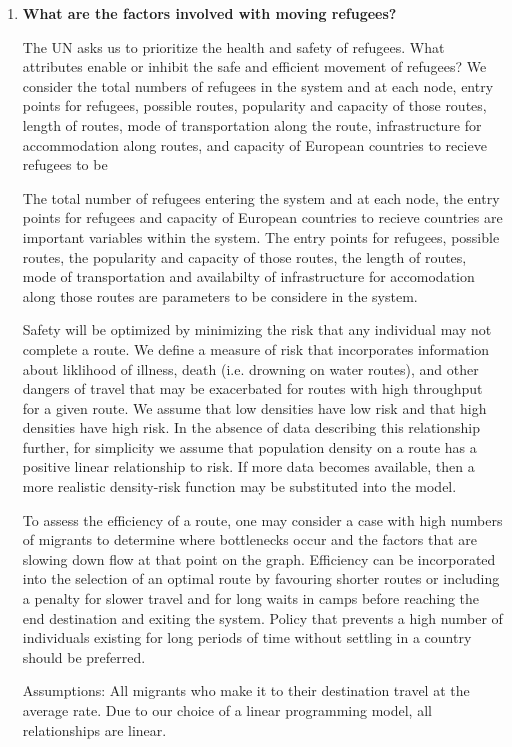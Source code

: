 \documentclass{article}
\begin{document}
\begin{enumerate}
    \item {\bf What are the factors involved with moving refugees?}

    The UN asks us to prioritize the health and safety of refugees. What attributes enable or inhibit the safe and efficient movement of refugees? We consider the total numbers of refugees in the system and at each node, entry points for refugees, possible routes, popularity and capacity of those routes, length of routes, mode of transportation along the route, infrastructure for accommodation along routes, and capacity of European countries to recieve refugees to be 

    The total number of refugees entering the system and at each node, the entry points for refugees and capacity of European countries to recieve countries are important variables within the system. The entry points for refugees, possible routes, the popularity and capacity of those routes, the length of routes, mode of transportation and availabilty of infrastructure for accomodation along those routes are parameters to be considere in the system.

    Safety will be optimized by minimizing the risk that any individual may not complete a route. We define a measure of risk that incorporates information about liklihood of illness, death (i.e. drowning on water routes), and other dangers of travel that may be exacerbated for routes with high throughput for a given route. We assume that low densities have low risk and that high densities have high risk. In the absence of data describing this relationship further, for simplicity we assume that population density on a route has a positive linear relationship to risk. If more data becomes available, then a more realistic density-risk function may be substituted into the model.

    To assess the efficiency of a route, one may consider a case with high numbers of migrants to determine where bottlenecks occur and the factors that are slowing down flow at that point on the graph. Efficiency can be incorporated into the selection of an optimal route by favouring shorter routes or including a penalty for slower travel and for long waits in camps before reaching the end destination and exiting the system. Policy that prevents a high number of individuals existing for long periods of time without settling in a country should be preferred.

    Assumptions: All migrants who make it to their destination travel at the average rate. Due to our choice of a linear programming model, all relationships are linear. 


\end{enumerate}
\end{document}
